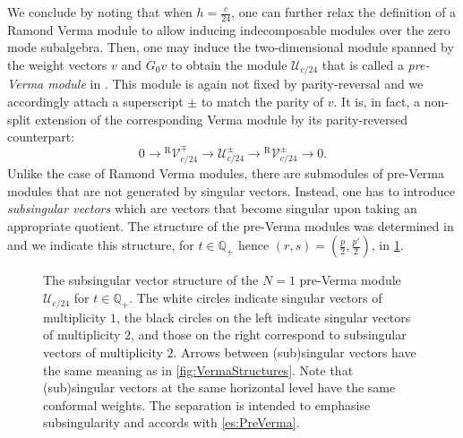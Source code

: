 \documentclass[a4paper,reqno,12pt]{report}
\theoremstyle{definition}
\numberwithin{equation}{section}
\newcommand{\QQ}{\mathbb{Q}}
\newcommand{\lra}{\longrightarrow}
\newcommand{\Ver}[1]{\mathcal{V}_{#1}}       %
\newcommand{\dses}[5]{0 \lra #1 \overset{#2}{\lra} #3 \overset{#4}{\lra} #5 \lra 0} %
\newcommand{\svs}{singular vectors}
\newcommand{\ssv}{subsingular vector}
\newcommand{\ssvs}{subsingular vectors}
\theoremstyle{plain}
\newcommand{\Mod}[1]{\mathcal{#1}}                 %
\newcommand{\RVer}[1]{{}^{\text{R}}\Ver{#1}}       %
\newcommand{\PreVer}[1]{\Mod{U}_{#1}}              %
\begin{document}
We conclude by noting that when $h = \frac{c}{24}$, one can further relax the definition of a Ramond Verma module to allow inducing indecomposable modules over the zero mode subalgebra.  Then, one may induce the two-dimensional module spanned by the weight vectors $v$ and $G_0 v$ to obtain the module $\PreVer{c/24}$ that is called a \emph{pre-Verma module} in \cite{IohRepI03,IohStr06}.  This module is again not fixed by parity-reversal and we accordingly attach a superscript $\pm$ to match the parity of $v$.  It is, in fact, a non-split extension of the corresponding Verma module by its parity-reversed counterpart:
\begin{equation} \label{es:PreVerma}
\dses{\RVer{c/24}^{\mp}}{}{\PreVer{c/24}^{\pm}}{}{\RVer{c/24}^{\pm}}.
\end{equation}
Unlike the case of Ramond Verma modules, there are submodules of pre-Verma modules that are not generated by \svs{}.  Instead, one has to introduce \emph{\ssvs{}} which are vectors that become singular upon taking an appropriate quotient.  The structure of the pre-Verma modules was determined in \cite{IohStr06} and we indicate this structure, for $t \in \QQ_+$ hence $(r,s) = (\frac{p}{2}, \frac{p'}{2})$, in \cref{fig:PreVermaStructures}.

\begin{figure}
\caption{The \ssv{} structure of the $N=1$ pre-Verma module $\PreVer{c/24}$ for $t \in \QQ_+$.  The white circles indicate \svs{} of multiplicity $1$, the black circles on the left indicate \svs{} of multiplicity $2$, and those on the right correspond to \ssvs{} of multiplicity $2$.  Arrows between (sub)\svs{} have the same meaning as in \cref{fig:VermaStructures}.  Note that (sub)\svs{} at the same horizontal level have the same conformal weights.  The separation is intended to emphasise subsingularity and accords with \eqref{es:PreVerma}.} \label{fig:PreVermaStructures}
\end{figure}
\end{document}
